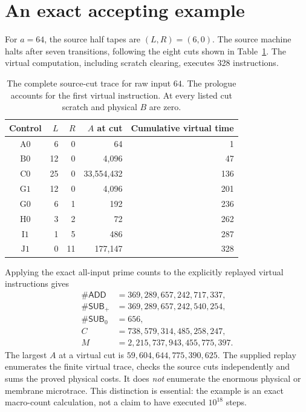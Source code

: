 \documentclass[11pt,letterpaper]{article}
\theoremstyle{definition}
\theoremstyle{remark}
\newcommand{\ADD}{\mathsf{ADD}}
\newcommand{\SUB}{\mathsf{SUB}}
\begin{document}
\section{An exact accepting example}\label{qoc:um:sec:example}
For $a=64$, the source half tapes are $(L,R)=(6,0)$. The source machine halts after seven transitions, following the eight cuts shown in Table~\ref{qoc:um:tab:example}. The virtual computation, including scratch clearing, executes 328 instructions.

\begin{table}[ht]
\centering
\begin{tabular}{crrrr}
\toprule
Control & $L$ & $R$ & $A$ at cut & Cumulative virtual time\\\midrule
$\mathrm A0$ & 6 & 0 & 64 & 1\\
$\mathrm B0$ & 12 & 0 & 4,096 & 47\\
$\mathrm C0$ & 25 & 0 & 33,554,432 & 136\\
$\mathrm G1$ & 12 & 0 & 4,096 & 201\\
$\mathrm G0$ & 6 & 1 & 192 & 236\\
$\mathrm H0$ & 3 & 2 & 72 & 262\\
$\mathrm I1$ & 1 & 5 & 486 & 287\\
$\mathrm J1$ & 0 & 11 & 177,147 & 328\\\bottomrule
\end{tabular}
\caption{The complete source-cut trace for raw input $64$. The prologue accounts for the first virtual instruction. At every listed cut scratch and physical $B$ are zero.}\label{qoc:um:tab:example}
\end{table}

Applying the exact all-input prime counts to the explicitly replayed virtual instructions gives
\begin{align*}
 \#\ADD&=369{,}289{,}657{,}242{,}717{,}337,\\
 \#\SUB_+&=369{,}289{,}657{,}242{,}540{,}254,\\
 \#\SUB_0&=656,\\
 C&=738{,}579{,}314{,}485{,}258{,}247,\\
 M&=2{,}215{,}737{,}943{,}455{,}775{,}397.
\end{align*}
The largest $A$ at a virtual cut is $59{,}604{,}644{,}775{,}390{,}625$. The supplied replay enumerates the finite virtual trace, checks the source cuts independently and sums the proved physical costs. It does \emph{not} enumerate the enormous physical or membrane microtrace. This distinction is essential: the example is an exact macro-count calculation, not a claim to have executed $10^{18}$ steps.
\end{document}
